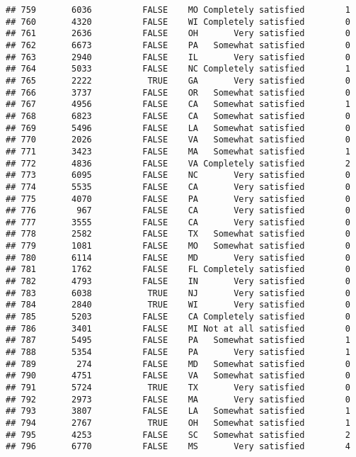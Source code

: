 \documentclass[]{book}
\theoremstyle{definition}
\theoremstyle{definition}
\theoremstyle{remark}
\begin{document}
\begin{verbatim}
## 759       6036          FALSE    MO Completely satisfied        1
## 760       4320          FALSE    WI Completely satisfied        0
## 761       2636          FALSE    OH       Very satisfied        0
## 762       6673          FALSE    PA   Somewhat satisfied        0
## 763       2940          FALSE    IL       Very satisfied        0
## 764       5033          FALSE    NC Completely satisfied        1
## 765       2222           TRUE    GA       Very satisfied        0
## 766       3737          FALSE    OR   Somewhat satisfied        0
## 767       4956          FALSE    CA   Somewhat satisfied        1
## 768       6823          FALSE    CA   Somewhat satisfied        0
## 769       5496          FALSE    LA   Somewhat satisfied        0
## 770       2026          FALSE    VA   Somewhat satisfied        0
## 771       3423          FALSE    MA   Somewhat satisfied        1
## 772       4836          FALSE    VA Completely satisfied        2
## 773       6095          FALSE    NC       Very satisfied        0
## 774       5535          FALSE    CA       Very satisfied        0
## 775       4070          FALSE    PA       Very satisfied        0
## 776        967          FALSE    CA       Very satisfied        0
## 777       3555          FALSE    CA       Very satisfied        0
## 778       2582          FALSE    TX   Somewhat satisfied        0
## 779       1081          FALSE    MO   Somewhat satisfied        0
## 780       6114          FALSE    MD       Very satisfied        0
## 781       1762          FALSE    FL Completely satisfied        0
## 782       4793          FALSE    IN       Very satisfied        0
## 783       6038           TRUE    NJ       Very satisfied        0
## 784       2840           TRUE    WI       Very satisfied        0
## 785       5203          FALSE    CA Completely satisfied        0
## 786       3401          FALSE    MI Not at all satisfied        0
## 787       5495          FALSE    PA   Somewhat satisfied        1
## 788       5354          FALSE    PA       Very satisfied        1
## 789        274          FALSE    MD   Somewhat satisfied        0
## 790       4751          FALSE    VA   Somewhat satisfied        0
## 791       5724           TRUE    TX       Very satisfied        0
## 792       2973          FALSE    MA       Very satisfied        0
## 793       3807          FALSE    LA   Somewhat satisfied        1
## 794       2767           TRUE    OH   Somewhat satisfied        1
## 795       4253          FALSE    SC   Somewhat satisfied        2
## 796       6770          FALSE    MS       Very satisfied        4

\end{verbatim}
\end{document}
